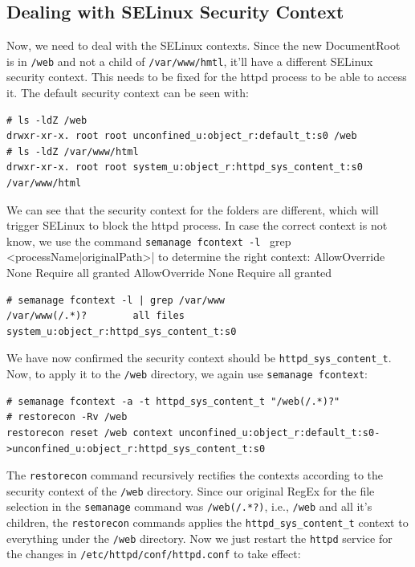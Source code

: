 \subsection{Dealing with SELinux Security Context}
Now, we need to deal with the SELinux contexts. Since the new DocumentRoot is in \verb|/web| and not a child of \verb|/var/www/hmtl|, it'll have a different SELinux security context. This needs to be fixed for the httpd process to be able to access it. The default security context can be seen with:

\vspace{-15pt}
\begin{verbatim}
# ls -ldZ /web
drwxr-xr-x. root root unconfined_u:object_r:default_t:s0 /web
# ls -ldZ /var/www/html
drwxr-xr-x. root root system_u:object_r:httpd_sys_content_t:s0 /var/www/html
\end{verbatim}
\vspace{-10pt}	

\noindent
We can see that the security context for the folders are different, which will trigger SELinux to block the httpd process. In case the correct context is not know, we use the command \verb|semanage fcontext -l | grep <processName|originalPath>| to determine the right context:
AllowOverride None
Require all granted	
\vspace{-15pt}AllowOverride None
Require all granted	
\begin{verbatim}
# semanage fcontext -l | grep /var/www
/var/www(/.*)?        all files        system_u:object_r:httpd_sys_content_t:s0 
\end{verbatim}
\vspace{-10pt}	

\noindent
We have now confirmed the security context should be \verb|httpd_sys_content_t|. Now, to apply it to the \verb|/web| directory, we again use \verb|semanage fcontext|: 

\vspace{-15pt}
\begin{verbatim}
# semanage fcontext -a -t httpd_sys_content_t "/web(/.*)?"
# restorecon -Rv /web
restorecon reset /web context unconfined_u:object_r:default_t:s0->unconfined_u:object_r:httpd_sys_content_t:s0
\end{verbatim}
\vspace{-10pt}	

\noindent
The \verb|restorecon| command recursively rectifies the contexts according to the security context of the \verb|/web| directory. Since our original RegEx for the file selection in the \verb|semanage| command was \verb|/web(/.*?)|, i.e., \verb|/web| and all it's children, the \verb|restorecon| commands applies the \verb|httpd_sys_content_t| context to everything under the \verb|/web| directory. Now we just restart the \verb|httpd| service for the changes in \verb|/etc/httpd/conf/httpd.conf| to take effect:


